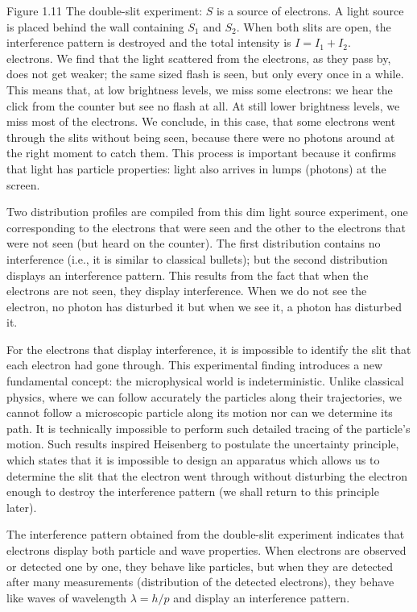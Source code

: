 \documentclass[10pt]{article}
\begin{document}
Figure 1.11 The double-slit experiment: $S$ is a source of electrons. A light source is placed behind the wall containing $S_{1}$ and $S_{2}$. When both slits are open, the interference pattern is destroyed and the total intensity is $I=I_{1}+I_{2}$.\\
electrons. We find that the light scattered from the electrons, as they pass by, does not get weaker; the same sized flash is seen, but only every once in a while. This means that, at low brightness levels, we miss some electrons: we hear the click from the counter but see no flash at all. At still lower brightness levels, we miss most of the electrons. We conclude, in this case, that some electrons went through the slits without being seen, because there were no photons around at the right moment to catch them. This process is important because it confirms that light has particle properties: light also arrives in lumps (photons) at the screen.

Two distribution profiles are compiled from this dim light source experiment, one corresponding to the electrons that were seen and the other to the electrons that were not seen (but heard on the counter). The first distribution contains no interference (i.e., it is similar to classical bullets); but the second distribution displays an interference pattern. This results from the fact that when the electrons are not seen, they display interference. When we do not see the electron, no photon has disturbed it but when we see it, a photon has disturbed it.

For the electrons that display interference, it is impossible to identify the slit that each electron had gone through. This experimental finding introduces a new fundamental concept: the microphysical world is indeterministic. Unlike classical physics, where we can follow accurately the particles along their trajectories, we cannot follow a microscopic particle along its motion nor can we determine its path. It is technically impossible to perform such detailed tracing of the particle's motion. Such results inspired Heisenberg to postulate the uncertainty principle, which states that it is impossible to design an apparatus which allows us to determine the slit that the electron went through without disturbing the electron enough to destroy the interference pattern (we shall return to this principle later).

The interference pattern obtained from the double-slit experiment indicates that electrons display both particle and wave properties. When electrons are observed or detected one by one, they behave like particles, but when they are detected after many measurements (distribution of the detected electrons), they behave like waves of wavelength $\lambda=h / p$ and display an interference pattern.
\end{document}
